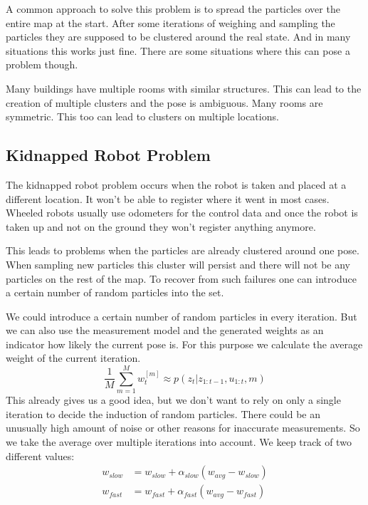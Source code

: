 A common approach to solve this problem is to spread the particles over the entire map at the start. After some iterations of weighing and sampling the particles they are supposed to be clustered around the real state. And in many situations this works just fine. There are some situations where this can pose a problem though.

Many buildings have multiple rooms with similar structures. This can lead to the creation of multiple clusters and the pose is ambiguous. Many rooms are symmetric. This too can lead to clusters on multiple locations. 
\subsection{Kidnapped Robot Problem} \label{sec:krp}
The kidnapped robot problem occurs when the robot is taken and placed at a different location. It won't be able to register where it went in most cases. Wheeled robots usually use odometers for the control data and once the robot is taken up and not on the ground they won't register anything anymore. 

This leads to problems when the particles are already clustered around one pose. When sampling new particles this cluster will persist and there will not be any particles on the rest of the map. To recover from such failures one can introduce a certain number of random particles into the set. \cite[p. 256]{Thrun:2005:PR:1121596}

We could introduce a certain number of random particles in every iteration. But we can also use the measurement model and the generated weights as an indicator how likely the current pose is. For this purpose we calculate the average weight of the current iteration. \cite[p. 257]{Thrun:2005:PR:1121596}
\begin{equation}
\dfrac{1}{M}\sum_{m=1}^{M}w_t^{[m]} \approx p(z_t|z_{1:t-1},u_{1:t},m)
\end{equation}
This already gives us a good idea, but we don't want to rely on only a single iteration to decide the induction of random particles. There could be an unusually high amount of noise or other reasons for inaccurate measurements. So we take the average over multiple iterations into account. We keep track of two different values:
\begin{equation}\label{eq:decay}
\begin{aligned}
w_{slow} &= w_{slow} + \alpha_{slow}(w_{avg}-w_{slow})\\
w_{fast} &= w_{fast} + \alpha_{fast}(w_{avg}-w_{fast})
\end{aligned}
\end{equation}

